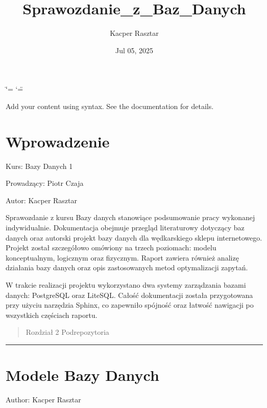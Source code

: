 \documentclass[letterpaper,10pt,english]{sphinxmanual}
\title{Sprawozdanie\_z\_Baz\_Danych}
\date{Jul 05, 2025}
\author{Kacper Rasztar}
\begin{document}
\ifdefined\shorthandoff
  \ifnum\catcode`\=\string=\active\shorthandoff{=}\fi
  \ifnum\catcode`\"=\active{}\fi
\fi

\pagestyle{empty}
\sphinxmaketitle
\pagestyle{plain}
\sphinxtableofcontents
\pagestyle{normal}
\label{\detokenize{index::doc}}


\sphinxAtStartPar
Add your content using  syntax. See the
documentation for details.

\sphinxstepscope


\chapter{Wprowadzenie}
\label{\detokenize{rozdzial1/index:wprowadzenie}}\label{\detokenize{rozdzial1/index::doc}}
\sphinxAtStartPar
Kurs: Bazy Danych 1

\sphinxAtStartPar
Prowadzący: Piotr Czaja

\sphinxAtStartPar
Autor: Kacper Rasztar

\sphinxAtStartPar
Sprawozdanie z kursu Bazy danych stanowiące podsumowanie pracy wykonanej indywidualnie. Dokumentacja obejmuje przegląd literaturowy dotyczący baz danych oraz autorski projekt bazy danych dla wędkarskiego sklepu internetowego. Projekt został szczegółowo omówiony na trzech poziomach: modelu konceptualnym, logicznym oraz fizycznym. Raport zawiera również analizę działania bazy danych oraz opis zastosowanych metod optymalizacji zapytań.

\sphinxAtStartPar
W trakcie realizacji projektu wykorzystano dwa systemy zarządzania bazami danych: PostgreSQL oraz LiteSQL. Całość dokumentacji została przygotowana przy użyciu narzędzia Sphinx, co zapewniło spójność oraz łatwość nawigacji po wszystkich częściach raportu.

\sphinxstepscope
\begin{quote}

\sphinxAtStartPar
Rozdział 2 \textendash{} Podrepozytoria
\end{quote}


\bigskip\hrule\bigskip


\sphinxstepscope


\chapter{Modele Bazy Danych}
\label{\detokenize{rozdzial3/index:modele-bazy-danych}}\label{\detokenize{rozdzial3/index::doc}}
\sphinxAtStartPar
Author: Kacper Rasztar
\end{document}
